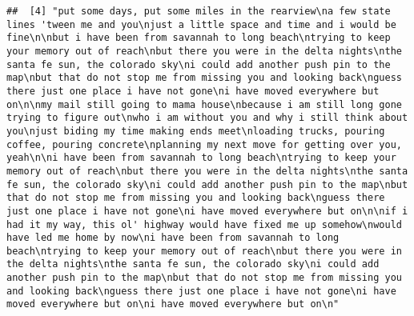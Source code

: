 \documentclass[]{article}
\begin{document}
\begin{verbatim}
##  [4] "put some days, put some miles in the rearview\na few state lines 'tween me and you\njust a little space and time and i would be fine\n\nbut i have been from savannah to long beach\ntrying to keep your memory out of reach\nbut there you were in the delta nights\nthe santa fe sun, the colorado sky\ni could add another push pin to the map\nbut that do not stop me from missing you and looking back\nguess there just one place i have not gone\ni have moved everywhere but on\n\nmy mail still going to mama house\nbecause i am still long gone trying to figure out\nwho i am without you and why i still think about you\njust biding my time making ends meet\nloading trucks, pouring coffee, pouring concrete\nplanning my next move for getting over you, yeah\n\ni have been from savannah to long beach\ntrying to keep your memory out of reach\nbut there you were in the delta nights\nthe santa fe sun, the colorado sky\ni could add another push pin to the map\nbut that do not stop me from missing you and looking back\nguess there just one place i have not gone\ni have moved everywhere but on\n\nif i had it my way, this ol' highway would have fixed me up somehow\nwould have led me home by now\ni have been from savannah to long beach\ntrying to keep your memory out of reach\nbut there you were in the delta nights\nthe santa fe sun, the colorado sky\ni could add another push pin to the map\nbut that do not stop me from missing you and looking back\nguess there just one place i have not gone\ni have moved everywhere but on\ni have moved everywhere but on\n"                                                                                                                                                                                                                                                                                                                                                                                                                                                                                                                                                                                                                                                                                                                                                                                                                                                                                                                                                                                                                                                                                                                                                                                                                                                                                                                                                           

\end{verbatim}
\end{document}
